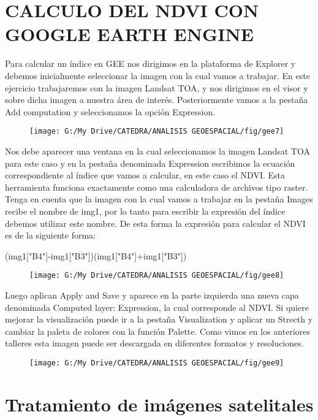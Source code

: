 \documentclass[a4paper,oneside,11pt,]{article}
\begin{document}
\section{CALCULO DEL NDVI CON GOOGLE EARTH ENGINE}
Para calcular un índice en GEE nos dirigimos en la plataforma de Explorer y debemos inicialmente seleccionar la imagen con la cual vamos a trabajar. En este ejercicio trabajaremos con la imagen Landsat TOA, y nos dirigimos en el visor y sobre dicha imagen a nuestra área de interés. Posteriormente vamos a la pestaña Add computation y seleccionamos la opción Expression.

\begin{figure}
\centering
\texttt{[image: G:/My Drive/CATEDRA/ANALISIS GEOESPACIAL/fig/gee7]}
\end{figure}

Nos debe aparecer una ventana en la cual seleccionamos la imagen Landsat TOA para este caso y en la pestaña denominada Expression escribimos la ecuación correspondiente al índice que vamos a calcular, en este caso el NDVI. Esta herramienta funciona exactamente como una calculadora de archivos tipo raster. Tenga en cuenta que la imagen con la cual vamos a trabajar en la pestaña Images recibe el nombre de img1, por lo tanto para escribir la expresión del índice debemos utilizar este nombre. De esta forma la expresión para calcular el NDVI es de la siguiente forma:

(img1["B4"]-img1["B3"])\/(img1["B4"]+img1["B3"])

\begin{figure}
\centering
\texttt{[image: G:/My Drive/CATEDRA/ANALISIS GEOESPACIAL/fig/gee8]}
\end{figure}

Luego aplican Apply and Save y aparece en la parte izquierda una nueva capa denominada Computed layer: Expression, la cual corresponde al NDVI. Si quiere mejorar la visualización puede ir a la pestaña Visualization y aplicar un Strecth y cambiar la paleta de colores con la función Palette. Como vimos en los anteriores talleres esta imagen puede ser descargada en diferentes formatos y resoluciones.

\begin{figure}
\centering
\texttt{[image: G:/My Drive/CATEDRA/ANALISIS GEOESPACIAL/fig/gee9]}
\end{figure}

\section{Tratamiento de imágenes satelitales}
\end{document}
